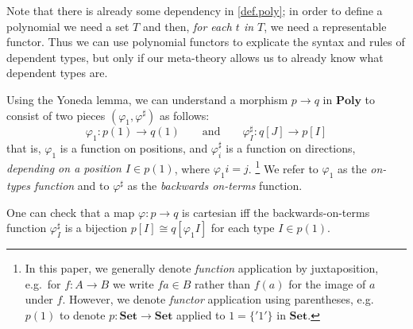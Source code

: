 \documentclass[11pt, one side, article]{memoir}
\theoremstyle{definition}
\theoremstyle{plain}
\newenvironment{remark}
  {\pushQED{\qed}\renewcommand{\qedsymbol}{$\lozenge$}\remarkx}
  {\popQED\endremarkx}
\newcommand{\Cat}[1]{\mathbf{#1}}%
\newcommand{\smset}{\Cat{Set}}
\newcommand{\poly}{\Cat{Poly}}
\newcommand{\0}{\textsf{0}}
\newcommand{\1}{\tn{\textsf{1}}}
\newcommand{\qqand}{\qquad\text{and}\qquad}
\begin{document}
\begin{remark}
Note that there is already some dependency in \cref{def.poly}; in order to define a polynomial we need a set $T$ and then, \emph{for each $t$ in $T$}, we need a representable functor. Thus we can use polynomial functors to explicate the syntax and rules of dependent types, but only if our meta-theory allows us to already know what dependent types are.
\end{remark}

\begin{remark}\label{rem.positions_and_directions}
Using the Yoneda lemma, we can understand a morphism $p\to q$ in $\poly$ to consist of two pieces $(\varphi_1,\varphi^\sharp)$ as follows:
\begin{equation}\label{eqn.mapsharp}
  \varphi_1\colon p(1)\to q(1)
  \qqand
  \varphi^\sharp_I\colon q[J]\to p[I]
\end{equation}
that is, $\varphi_1$ is a function on positions, and $\varphi^\sharp_i$ is a function on directions, \emph{depending on a position $I\in p(1)$}, where $\varphi_1 i=j$.%
\footnote{
In this paper, we generally denote \emph{function} application by juxtaposition, e.g.\ for $f\colon A\to B$ we write $fa\in B$ rather than $f(a)$ for the image of $a$ under $f$. However, we denote \emph{functor} application using parentheses, e.g.\ $p(1)$ to denote $p\colon\smset\to\smset$ applied to $1=\{{'1'}\}$ in $\smset$.
}
We refer to $\varphi_1$ as the \emph{on-types function} and to $\varphi^\sharp$ as the \emph{backwards on-terms} function.

One can check that a map $\varphi\colon p\to q$ is cartesian iff the backwards-on-terms function $\varphi^\sharp_I$ is a bijection $p[I]\cong q[\varphi_1I]$ for each type $I\in p(1)$.
\end{remark}
\end{document}

